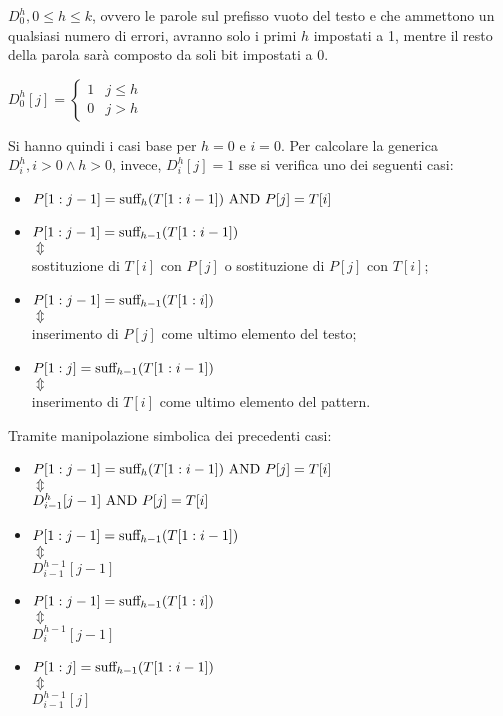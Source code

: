 $D_0^h, 0 \le h \le k$, ovvero le parole sul prefisso vuoto del testo e che ammettono un qualsiasi numero di errori, avranno solo i primi $h$ impostati a 1, mentre il resto della parola sarà composto da soli bit impostati a 0. 
\begin{center}
    $D_0^h[j] = \begin{cases}
        1 & j \le h \\
        0 & j > h
    \end{cases}$
\end{center}
Si hanno quindi i casi base per $h = 0$ e $i = 0$.
Per calcolare la generica $D_i^h, i > 0 \land h > 0$, invece, $D_i^h[j] = 1$ sse si verifica uno dei seguenti casi:
\begin{itemize}
    \item $P[1:j-1] = \textnormal{suff}_h(T[1:i-1]) \textnormal{ AND } P[j] = T[i]$
    \item $P[1:j-1] = \textnormal{suff}_{h-1}(T[1:i-1])$\\
        $\Updownarrow$ \\
        sostituzione di $T[i]$ con $P[j]$ o sostituzione di $P[j]$ con $T[i]$;
    \item $P[1:j-1] = \textnormal{suff}_{h-1}(T[1:i])$ \\
    $\Updownarrow$ \\
    inserimento di $P[j]$ come ultimo elemento del testo;
    \item $P[1:j] = \textnormal{suff}_{h-1}(T[1:i-1])$ \\
    $\Updownarrow$ \\
    inserimento di $T[i]$ come ultimo elemento del pattern.
\end{itemize}
Tramite manipolazione simbolica dei precedenti casi:
\begin{itemize}
    \item $P[1:j-1] = \textnormal{suff}_h(T[1:i-1]) \textnormal{ AND } P[j] = T[i]$ \\
    $\Updownarrow$ \\
    $D_{i-1}^h[j-1] \textnormal{ AND } P[j] = T[i]$
    \item $P[1:j-1] = \textnormal{suff}_{h-1}(T[1:i-1])$\\
    $\Updownarrow$ \\
    $D_{i-1}^{h-1}[j-1]$
    \item $P[1:j-1] = \textnormal{suff}_{h-1}(T[1:i])$\\
    $\Updownarrow$\\
    $D_i^{h-1}[j-1]$
    \item $P[1:j] = \textnormal{suff}_{h-1}(T[1:i-1])$\\
    $\Updownarrow$\\
    $D_{i-1}^{h-1}[j]$
\end{itemize}
